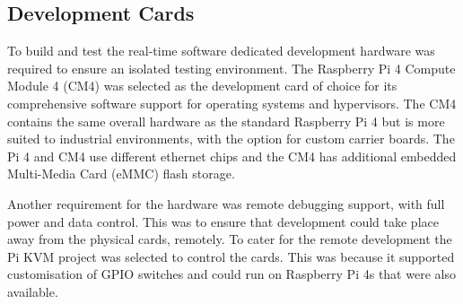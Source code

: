 \graphicspath{{main/design/hardware/graphics/}}

\subsection{Development Cards}

To build and test the real-time software dedicated development hardware was required to ensure an isolated testing environment. The Raspberry Pi 4 Compute Module 4 (CM4) was selected as the development card of choice for its comprehensive software support for operating systems and hypervisors. The CM4 contains the same overall hardware as the standard Raspberry Pi 4 but is more suited to industrial environments, with the option for custom carrier boards. The Pi 4 and CM4 use different ethernet chips and the CM4 has additional embedded Multi-Media Card (eMMC) flash storage.

Another requirement for the hardware was remote debugging support, with full power and data control. This was to ensure that development could take place away from the physical cards, remotely. To cater for the remote development the Pi KVM project was selected to control the cards. This was because it supported customisation of GPIO switches and could run on Raspberry Pi 4s that were also available.

